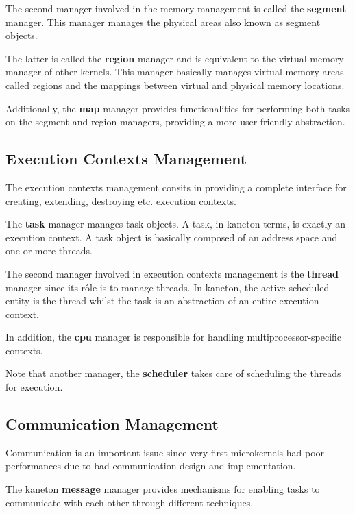 The second manager involved in the memory management is called the
\textbf{segment} manager. This manager manages the physical areas also known as
segment objects.

The latter is called the \textbf{region} manager and is equivalent to the
virtual memory manager of other kernels. This manager basically manages
virtual memory areas called regions and the mappings between virtual and
physical memory locations.

Additionally, the \textbf{map} manager provides functionalities for performing
both tasks on the segment and region managers, providing a more user-friendly
abstraction.


\subsection*{Execution Contexts Management}

The execution contexts management consits in providing a complete interface
for creating, extending, destroying etc. execution contexts.

The \textbf{task} manager manages task objects. A task, in kaneton terms, is
exactly an execution context. A task object is basically composed of an
address space and one or more threads.

The second manager involved in execution contexts management is the
\textbf{thread} manager since its r\^ole is to manage threads. In kaneton, the
active scheduled entity is the thread whilst the task is an abstraction of an
entire execution context.

In addition, the \textbf{cpu} manager is responsible for handling
multiprocessor-specific contexts.

Note that another manager, the \textbf{scheduler} takes care of scheduling
the threads for execution.


\subsection*{Communication Management}

Communication is an important issue since very first microkernels had poor
performances due to bad communication design and implementation.

The kaneton \textbf{message} manager provides mechanisms for enabling tasks
to communicate with each other through different techniques.

